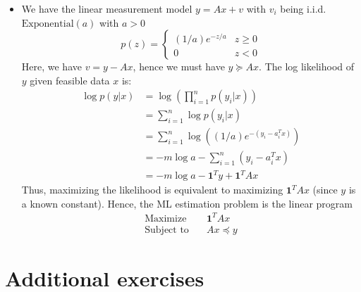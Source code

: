 \documentclass{article}
\newcommand{\1}{\mathbf{1}}
\begin{document}
\begin{itemize}
  \item[7.1] We have the linear measurement model $y = A x + v$ with $v_i$ being i.i.d. $\text{Exponential}(a)$ with $a > 0$
  \[ p(z) = \begin{cases} (1/a) e^{-z/a} & z \ge 0 \\ 0 & z < 0 \end{cases} \]
  Here, we have $v = y - A x$, hence we must have $y \succeq A x$. The log likelihood of $y$ given feasible data $x$ is:
  \begin{align*}
    \log p(y | x) &= \log \left(\prod_{i=1}^n p(y_i | x)\right) \\
    &= \sum_{i=1}^n \log p(y_i | x) \\
    &= \sum_{i=1}^n \log\left((1/a) e^{-(y_i - a_i^T x)}\right) \tag{$v = y - A x$} \\
    &= -m \log a - \sum_{i=1}^n (y_i - a_i^T x) \\
    &= -m \log a - \1^T y + \1^T A x
  \end{align*}
  Thus, maximizing the likelihood is equivalent to maximizing $\1^T A x$ (since $y$ is a known constant). Hence, the ML estimation problem is the linear program
  \begin{align*}
    \text{Maximize} \quad &\1^T A x \\
    \text{Subject to} \quad &A x \preceq y
  \end{align*}
\end{itemize}

\section{Additional exercises}
\end{document}
